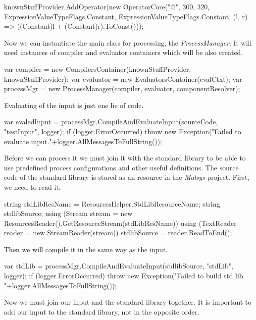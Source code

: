 \begin{Csharp}
knownStuffProvider.AddOperator(new OperatorCore("@", 300, 320,
		ExpressionValueTypeFlags.Constant, ExpressionValueTypeFlags.Constant,
		(l, r) => ((Constant)l + (Constant)r).ToConst()));
\end{Csharp}

Now we can instantiate the main class for \lsystem processing, the \emph{ProcessManager}.
It will need instances of compiler and evaluator containers which will be also created.

\begin{Csharp}
var compiler = new CompilersContainer(knownStuffProvider, knownStuffProvider);
var evaluator = new EvaluatorsContainer(evalCtxt);
var processMgr = new ProcessManager(compiler, evaluator, componentResolver);
\end{Csharp}

Evaluating of the \lsystem input is just one lie of code.

\begin{Csharp}
var evaledInput = processMgr.CompileAndEvaluateInput(sourceCode, "testInput", logger);
if (logger.ErrorOccurred) {
	throw new Exception("Failed to evaluate input."+logger.AllMessagesToFullString());
}
\end{Csharp}

Before we can process it we must join it with the standard library to be able to use predefined process configurations and other useful definitions.
The source code of the standard library is stored as an resource in the \emph{Malsys} project.
First, we need to read it.

\begin{Csharp}
string stdLibResName = ResourcesHelper.StdLibResourceName;
string stdlibSource;
using (Stream stream = new ResourcesReader().GetResourceStream(stdLibResName)) {
	using (TextReader reader = new StreamReader(stream)) {
		stdlibSource = reader.ReadToEnd();
	}
}
\end{Csharp}

Then we will compile it in the same way as the \lsystem input.

\begin{Csharp}
var stdLib = processMgr.CompileAndEvaluateInput(stdlibSource, "stdLib", logger);
if (logger.ErrorOccurred) {
	throw new Exception("Failed to build std lib. "+logger.AllMessagesToFullString());
}
\end{Csharp}

Now we must join our input and the standard library together.
It is important to add our input to the standard library, not in the opposite order.

